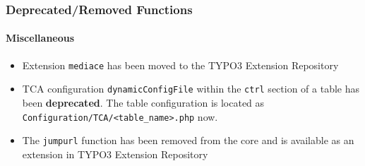 
\begin{frame}[fragile]
	\frametitle{Deprecated/Removed Functions}
	\framesubtitle{Miscellaneous}

	\begin{itemize}

		\item Extension \texttt{mediace} has been moved to the TYPO3 Extension Repository

		\item TCA configuration \texttt{dynamicConfigFile} within the \texttt{ctrl} section of a
			table has been \textbf{deprecated}.
			The table configuration is located as \texttt{Configuration/TCA/<table\_name>.php} now.

		\item The \texttt{jumpurl} function has been removed from the core and is available
			as an extension in TYPO3 Extension Repository

	\end{itemize}

\end{frame}

